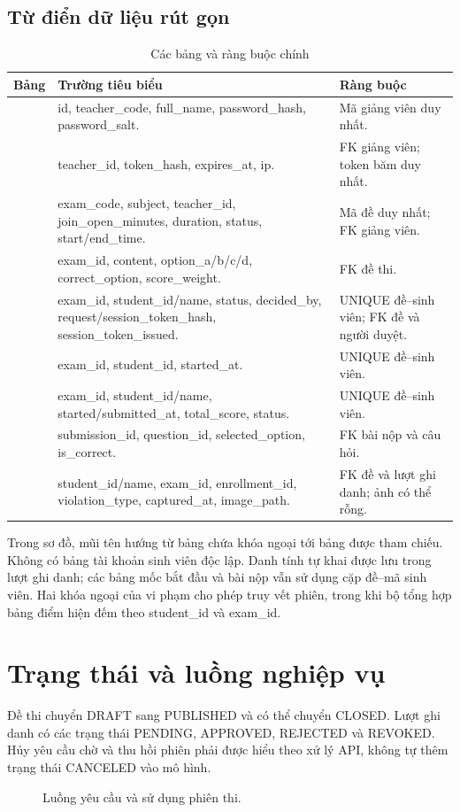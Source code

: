 \subsection{Từ điển dữ liệu rút gọn}
\begin{longtable}{@{}L{3.2cm}L{7.4cm}L{4cm}@{}}
\caption{Các bảng và ràng buộc chính}\\
\toprule Bảng & Trường tiêu biểu & Ràng buộc \\\midrule\endhead
{} & id, teacher\_code, full\_name, password\_hash, password\_salt. & Mã giảng viên duy nhất.\\
 & teacher\_id, token\_hash, expires\_at, ip. & FK giảng viên; token băm duy nhất.\\
 & exam\_code, subject, teacher\_id, join\_open\_minutes, duration, status, start/end\_time. & Mã đề duy nhất; FK giảng viên.\\
 & exam\_id, content, option\_a/b/c/d, correct\_option, score\_weight. & FK đề thi.\\
 & exam\_id, student\_id/name, status, decided\_by, request/session\_token\_hash, session\_token\_issued. & UNIQUE đề--sinh viên; FK đề và người duyệt.\\
 & exam\_id, student\_id, started\_at. & UNIQUE đề--sinh viên.\\
 & exam\_id, student\_id/name, started/submitted\_at, total\_score, status. & UNIQUE đề--sinh viên.\\
 & submission\_id, question\_id, selected\_option, is\_correct. & FK bài nộp và câu hỏi.\\
 & student\_id/name, exam\_id, enrollment\_id, violation\_type, captured\_at, image\_path. & FK đề và lượt ghi danh; ảnh có thể rỗng.\\
\bottomrule
\end{longtable}

Trong sơ đồ, mũi tên hướng từ bảng chứa khóa ngoại tới bảng được tham chiếu. Không có bảng tài khoản sinh viên độc lập. Danh tính tự khai được lưu trong lượt ghi danh; các bảng mốc bắt đầu và bài nộp vẫn sử dụng cặp đề--mã sinh viên. Hai khóa ngoại của vi phạm cho phép truy vết phiên, trong khi bộ tổng hợp bảng điểm hiện đếm theo student\_id và exam\_id.

\section{Trạng thái và luồng nghiệp vụ}
Đề thi chuyển DRAFT sang PUBLISHED và có thể chuyển CLOSED. Lượt ghi danh có các trạng thái PENDING, APPROVED, REJECTED và REVOKED. Hủy yêu cầu chờ và thu hồi phiên phải được hiểu theo xử lý API, không tự thêm trạng thái CANCELED vào mô hình.
\begin{figure}[H]\centering
\caption{Luồng yêu cầu và sử dụng phiên thi.}\end{figure}

